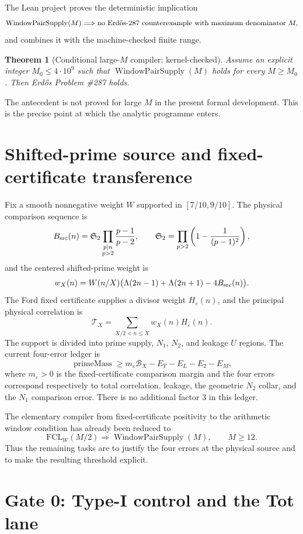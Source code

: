 \documentclass[11pt]{article}
\newtheorem{theorem}{Theorem}[section]
\theoremstyle{definition}
\newcommand{\1}{\mathbf 1}
\newcommand{\BX}{\mathcal B_X}
\newcommand{\TX}{\mathcal T_X}
\newcommand{\WPS}{\operatorname{WindowPairSupply}}
\begin{document}
The Lean project proves the deterministic implication
\[
\WPS(M)\Longrightarrow \text{no Erd\H{o}s-287 counterexample with maximum denominator }M,
\]
and combines it with the machine-checked finite range.

\begin{theorem}[Conditional large-$M$ compiler; kernel-checked]
Assume an explicit integer $M_0\le 4\cdot10^9$ such that $\WPS(M)$ holds for every $M\ge M_0$. Then Erd\H{o}s Problem \#287 holds.
\end{theorem}

The antecedent is not proved for large $M$ in the present formal development. This is the precise point at which the analytic programme enters.

\section{Shifted-prime source and fixed-certificate transference}

Fix a smooth nonnegative weight $W$ supported in $[7/10,9/10]$. The physical comparison sequence is
\[
B_{\rm src}(n)=\mathfrak S_2\prod_{\substack{p\mid n\\p>2}}\frac{p-1}{p-2},
\qquad
\mathfrak S_2=\prod_{p>2}\left(1-\frac1{(p-1)^2}\right),
\]
and the centered shifted-prime weight is
\[
w_X(n)=W(n/X)\bigl(\Lambda(2n-1)+\Lambda(2n+1)-4B_{\rm src}(n)\bigr).
\]
The Ford fixed certificate supplies a divisor weight $H_\varepsilon(n)$, and the principal physical correlation is
\[
\TX=\sum_{X/2<n\le X}w_X(n)H_\varepsilon(n).
\]
The support is divided into prime supply, $N_1$, $N_2$, and leakage $U$ regions. The current four-error ledger is
\[
\operatorname{primeMass}\ge m_\varepsilon\BX-E_T-E_L-E_2-E_M,
\tag{3.1}
\]
where $m_\varepsilon>0$ is the fixed-certificate comparison margin and the four errors correspond respectively to total correlation, leakage, the geometric $N_2$ collar, and the $N_1$ comparison error. There is no additional factor $3$ in this ledger.

The elementary compiler from fixed-certificate positivity to the arithmetic window condition has already been reduced to
\[
\mathrm{FCL}_W(M/2)\Longrightarrow \WPS(M),\qquad M\ge12.
\tag{3.2}
\]
Thus the remaining tasks are to justify the four errors at the physical source and to make the resulting threshold explicit.

\section{Gate 0: Type-I control and the Tot lane}
\end{document}
